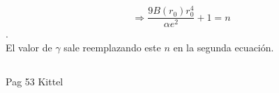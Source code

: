 \documentclass[a4paper]{article}
\begin{document}
$$ \Rightarrow \frac{9B(r_{0})r_{0}^{4}}{\alpha e^{2}} + 1 = n$$.\\

El valor de $\gamma$ sale reemplazando este $n$ en la segunda ecuaci\'on.

\subsection{}

Pag 53 Kittel

\newpage
\begin{thebibliography}{99} %
 
\end{thebibliography}


\end{document}
